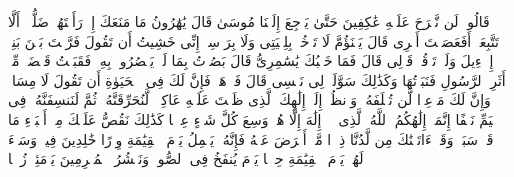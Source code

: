 \stopbuffer
\startbuffer[\q:20:91]
قَالُوا۟ لَن نَّبۡرَحَ عَلَیۡهِ عَٰكِفِینَ حَتَّىٰ یَرۡجِعَ إِلَیۡنَا مُوسَىٰ%
\stopbuffer
\startbuffer[\q:20:92]
قَالَ یَٰهَٰرُونُ مَا مَنَعَكَ إِذۡ رَأَیۡتَهُمۡ ضَلُّوۤا۟%
\stopbuffer
\startbuffer[\q:20:93]
أَلَّا تَتَّبِعَنِۖ أَفَعَصَیۡتَ أَمۡرِی%
\stopbuffer
\startbuffer[\q:20:94]
قَالَ یَبۡنَؤُمَّ لَا تَأۡخُذۡ بِلِحۡیَتِی وَلَا بِرَأۡسِیۤۖ إِنِّی خَشِیتُ أَن تَقُولَ فَرَّقۡتَ بَیۡنَ بَنِیۤ إِسۡرَٰۤءِیلَ وَلَمۡ تَرۡقُبۡ قَوۡلِی%
\stopbuffer
\startbuffer[\q:20:95]
قَالَ فَمَا خَطۡبُكَ یَٰسَٰمِرِیُّ%
\stopbuffer
\startbuffer[\q:20:96]
قَالَ بَصُرۡتُ بِمَا لَمۡ یَبۡصُرُوا۟ بِهِۦ فَقَبَضۡتُ قَبۡضَةࣰ مِّنۡ أَثَرِ ٱلرَّسُولِ فَنَبَذۡتُهَا وَكَذَٰلِكَ سَوَّلَتۡ لِی نَفۡسِی%
\stopbuffer
\startbuffer[\q:20:97]
قَالَ فَٱذۡهَبۡ فَإِنَّ لَكَ فِی ٱلۡحَیَوٰةِ أَن تَقُولَ لَا مِسَاسَۖ وَإِنَّ لَكَ مَوۡعِدࣰا لَّن تُخۡلَفَهُۥۖ وَٱنظُرۡ إِلَىٰۤ إِلَٰهِكَ ٱلَّذِی ظَلۡتَ عَلَیۡهِ عَاكِفࣰاۖ لَّنُحَرِّقَنَّهُۥ ثُمَّ لَنَنسِفَنَّهُۥ فِی ٱلۡیَمِّ نَسۡفًا%
\stopbuffer
\startbuffer[\q:20:98]
إِنَّمَاۤ إِلَٰهُكُمُ ٱللَّهُ ٱلَّذِی لَاۤ إِلَٰهَ إِلَّا هُوَۚ وَسِعَ كُلَّ شَیۡءٍ عِلۡمࣰا%
\stopbuffer
\startbuffer[\q:20:99]
كَذَٰلِكَ نَقُصُّ عَلَیۡكَ مِنۡ أَنۢبَاۤءِ مَا قَدۡ سَبَقَۚ وَقَدۡ ءَاتَیۡنَٰكَ مِن لَّدُنَّا ذِكۡرࣰا%
\stopbuffer
\startbuffer[\q:20:100]
مَّنۡ أَعۡرَضَ عَنۡهُ فَإِنَّهُۥ یَحۡمِلُ یَوۡمَ ٱلۡقِیَٰمَةِ وِزۡرًا%
\stopbuffer
\startbuffer[\q:20:101]
خَٰلِدِینَ فِیهِۖ وَسَاۤءَ لَهُمۡ یَوۡمَ ٱلۡقِیَٰمَةِ حِمۡلࣰا%
\stopbuffer
\startbuffer[\q:20:102]
یَوۡمَ یُنفَخُ فِی ٱلصُّورِۚ وَنَحۡشُرُ ٱلۡمُجۡرِمِینَ یَوۡمَئِذࣲ زُرۡقࣰا%
\stopbuffer
